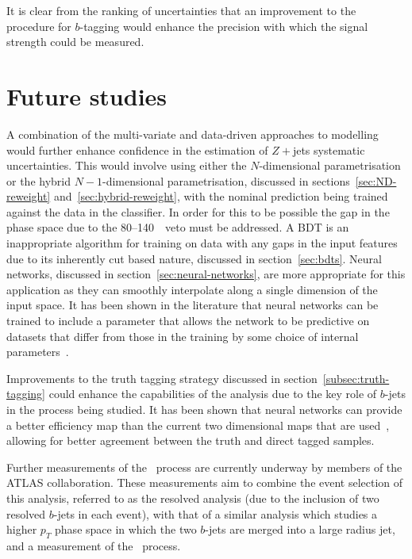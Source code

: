 It is clear from the ranking of uncertainties that an improvement to the
procedure for $b$-tagging would enhance the precision with which the signal
strength could be measured.

\section{Future studies}%
\label{sec:future}

A combination of the multi-variate and data-driven approaches to modelling would
further enhance confidence in the estimation of $Z+$jets systematic
uncertainties. This would involve using either the $N$-dimensional
parametrisation or the hybrid $N-1$-dimensional parametrisation, discussed in
sections~\ref{sec:ND-reweight} and~\ref{sec:hybrid-reweight}, with the nominal
prediction being trained against the data in the classifier. In order for this
to be possible the gap in the phase space due to the 80--140~\GeV\ veto must be
addressed. A BDT is an inappropriate algorithm for training on data with any
gaps in the input features due to its inherently cut based nature, discussed in
section~\ref{sec:bdts}. Neural networks, discussed in
section~\ref{sec:neural-networks}, are more appropriate for this application as
they can smoothly interpolate along a single dimension of the input space. It
has been shown in the literature that neural networks can be trained to include
a parameter that allows the network to be predictive on datasets that differ
from those in the training by some choice of internal
parameters~\cite{param-hep, param-hep-2}.

Improvements to the truth tagging strategy discussed in
section~\ref{subsec:truth-tagging} could enhance the capabilities of the
analysis due to the key role of $b$-jets in the process being studied. It has
been shown that neural networks can provide a better efficiency map than the
current two dimensional maps that are used~\cite{nn-truth-tagging}, allowing for
better agreement between the truth and direct tagged samples.

Further measurements of the \VHbb\ process are currently underway by members of
the ATLAS collaboration. These measurements aim to combine the event selection
of this analysis, referred to as the resolved analysis (due to the inclusion of
two resolved $b$-jets in each event), with that of a similar analysis which
studies a higher $p_T$ phase space in which the two $b$-jets are merged into a
large radius jet, and a measurement of the \VHcc\ process.